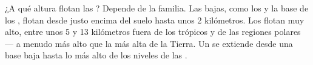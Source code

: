 ¿A qué altura flotan las ? Depende de la familia. Las  bajas,
como los  y la base de los , flotan desde justo encima del
suelo hasta unos 2 kilómetros. Los  flotan muy alto, entre unos 5 y
13 kilómetros fuera de los trópicos y de las regiones polares --- a menudo
más alto que la  más alta de la Tierra.
Un  se extiende desde una base baja hasta lo más alto de los
niveles de las .

